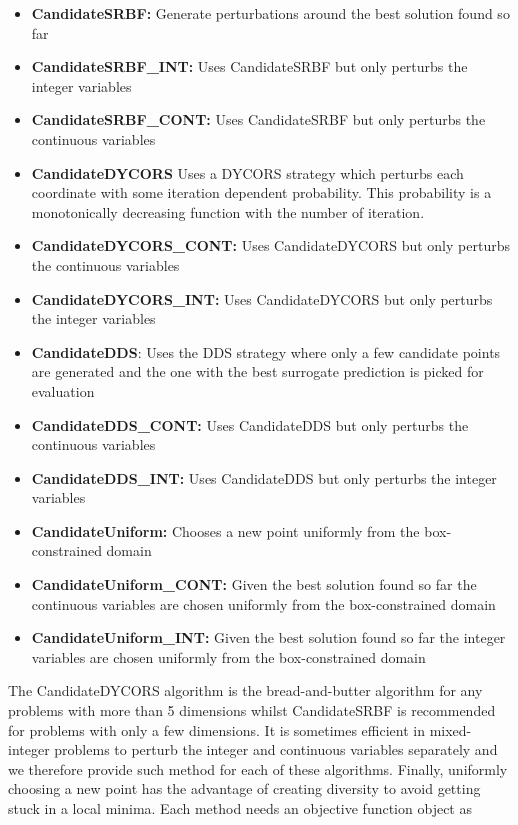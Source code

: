 \documentclass[]{article}
\begin{document}
\begin{itemize}
\item \textbf{CandidateSRBF:} Generate perturbations around the best solution 
found so far
\item \textbf{CandidateSRBF\_INT:} Uses CandidateSRBF but only perturbs the 
integer variables
\item \textbf{CandidateSRBF\_CONT:} Uses CandidateSRBF but only perturbs 
the continuous variables
\item \textbf{CandidateDYCORS} Uses a DYCORS strategy which perturbs 
each coordinate with some iteration dependent probability. This probability is 
a monotonically decreasing function with the number of iteration.
\item \textbf{CandidateDYCORS\_CONT:} Uses CandidateDYCORS but only 
perturbs the continuous variables
\item \textbf{CandidateDYCORS\_INT:} Uses CandidateDYCORS but only 
perturbs the integer variables
\item \textbf{CandidateDDS}: Uses the DDS strategy where only a few candidate 
points are generated and the one with the best surrogate prediction is picked 
for evaluation
\item \textbf{CandidateDDS\_CONT:} Uses CandidateDDS but only perturbs 
the continuous variables
\item \textbf{CandidateDDS\_INT:} Uses CandidateDDS but only perturbs the 
integer variables
\item \textbf{CandidateUniform:} Chooses a new point uniformly from the 
box-constrained domain
\item \textbf{CandidateUniform\_CONT:} Given the best solution found so far 
the continuous variables are chosen uniformly from the box-constrained domain
\item \textbf{CandidateUniform\_INT:} Given the best solution found so far the 
integer variables are chosen uniformly from the box-constrained domain
\end{itemize}
The CandidateDYCORS algorithm is the bread-and-butter algorithm for any 
problems with more than 5 dimensions whilst CandidateSRBF is recommended 
for problems with only a few dimensions. It is sometimes efficient in mixed-integer 
problems to perturb the integer and continuous variables separately and we 
therefore provide such method for each of these algorithms. Finally, uniformly 
choosing a new point has the advantage of creating diversity to avoid getting 
stuck in a local minima. Each method needs an objective function object as 
\end{document}
